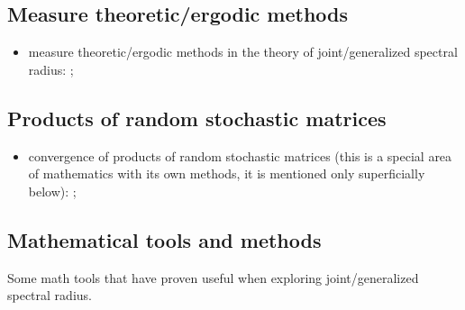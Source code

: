 \documentclass[a4paper,fleqn]{article}
\let\cite=\citep
\begin{document}
\subsection*{Measure theoretic/ergodic methods}
\begin{itemize}
  \item measure theoretic/ergodic methods in the theory of joint/generalized
        spectral radius: \cite{AltPar:CDC19, AltPar:SIAMJCO20, BochiRams:JMD16,
          BG:JEP19, BM:JAMS02, Dai:N11, Dai:JDE11, Dai:LAA12, Dai:JFI14,
          DHX:SIAMJCO08, DHX:CDC08, DHX:ArXiv11:1, DHX:ERA11, DHX:AUT11,
          DHX:PAMS13, DHX:IEEETAC15, Gomes:2017, KM:ArXiv25, Moh:JSP22,
          Morris:ADVM10, Morris:JFA12, Morris:PLMS13, Morris:EDTS17,
          Morris:EDTS17:2, NSch:LAA99, OgurMart:LAA14, ZCL:DCDSA18};
\end{itemize}

\subsection*{Products of random stochastic matrices}
\begin{itemize}
  \item convergence of products of random stochastic matrices (this is a
        special area of mathematics with its own methods, it is mentioned only
        superficially below): \cite{AT:JMAA77, BXMS:IEEETSP13, Cohn:IJMMS,
          CMS:LAA21, CMMS:EJP23, DHH:ArXiv14, DHX:AUT11, OgurMart:LAA13,
          Leiz:LAA92, LimaRah:JPA94, Prot:MS11, Thomas:ArXiv11, Thomas:ArXiv13,
          Wolf:PAMS};
\end{itemize}

\subsection*{Mathematical tools and methods}
Some math tools that have proven useful when exploring
joint/generalized spectral radius.
\end{document}
